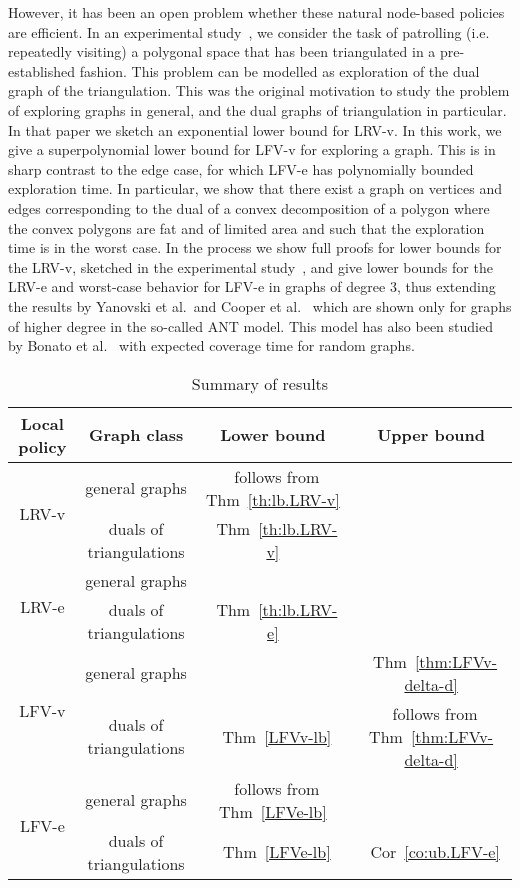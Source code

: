 However, it has been an open problem whether these natural node-based policies
are efficient. In an experimental study~\cite{mlf+-lpeptr-15}, we consider the task of patrolling
(i.e. repeatedly visiting) a
polygonal space that has been triangulated in a pre-established fashion.
This problem can be modelled as exploration of the dual graph of the triangulation.
This was the original motivation to study the problem of exploring graphs
in general, and the dual graphs of triangulation in particular.
In that paper we sketch an exponential lower
bound for LRV-v.
In this work, we give a superpolynomial lower bound for
LFV-v for exploring a graph. This is in sharp contrast to the edge case,
for which LFV-e has polynomially bounded exploration time. In particular,
we show that there exist a graph on  vertices and  edges corresponding to the dual of
a convex
decomposition of a polygon where the convex polygons are fat and of limited area and
such that the exploration time is  in the worst case.
In the process we show full proofs for
lower bounds for the LRV-v, sketched in the experimental study~\cite{mlf+-lpeptr-15},
and give lower bounds for the LRV-e and worst-case behavior for LFV-e in graphs of degree 3,
thus extending the results by Yanovski et al.~and Cooper et al.~\cite{cik+-drwug-11,yvb+-algo-03} which are shown only
for graphs of higher degree in the so-called ANT model. This model has also been studied by Bonato et al.~\cite{b+-waw-15}
with expected coverage time for random graphs.

\begin{table}[h]
\caption{Summary of results}
\centering
\begin{tabular}{|c|c|c|c|}
  \hline
Local policy & Graph class & Lower bound & Upper bound \\
   \hline
   \multirow{2}{*}{LRV-v} & general graphs  & ~follows from  Thm~\ref{th:lb.LRV-v} &  \\
   & duals of triangulations & ~Thm~\ref{th:lb.LRV-v} &  \\
   \hline
  \multirow{2}{*}{LRV-e} & general graphs  & ~\cite{cik+-drwug-11} & \\
  & duals of triangulations & ~Thm~\ref{th:lb.LRV-e} &  \\
  \hline
  \multirow{2}{*}{LFV-v} & general graphs & ~\cite{ksl+-ants-01,mcvw+-distr-05} & ~Thm~\ref{thm:LFVv-delta-d}\\
   & duals of triangulations & ~Thm~\ref{LFVv-lb} &  ~follows from Thm~\ref{thm:LFVv-delta-d}\\
  \hline
  \multirow{2}{*}{LFV-e} & general graphs &  ~follows from  Thm~\ref{LFVe-lb}& ~\cite{cik+-drwug-11} \\
   & duals of triangulations & ~Thm~\ref{LFVe-lb} & ~Cor~\ref{co:ub.LFV-e} \\
   \hline
\end{tabular}
\label{table:results}
\end{table}

